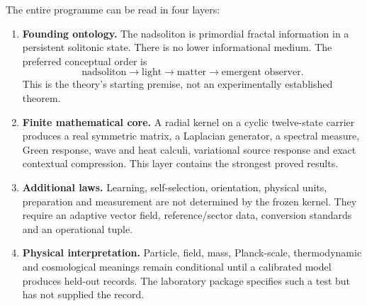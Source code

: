 \documentclass[11pt,a4paper]{article}
\theoremstyle{definition}
\theoremstyle{remark}
\begin{document}
The entire programme can be read in four layers:

\begin{enumerate}
\item \textbf{Founding ontology.} The nadsoliton is primordial fractal information in a persistent solitonic state. There is no lower informational medium. The preferred conceptual order is
\[
\text{nadsoliton}\longrightarrow\text{light}\longrightarrow\text{matter}\longrightarrow\text{emergent observer}.
\]
This is the theory's starting premise, not an experimentally established theorem.

\item \textbf{Finite mathematical core.} A radial kernel on a cyclic twelve-state carrier produces a real symmetric matrix, a Laplacian generator, a spectral measure, Green response, wave and heat calculi, variational source response and exact contextual compression. This layer contains the strongest proved results.

\item \textbf{Additional laws.} Learning, self-selection, orientation, physical units, preparation and measurement are not determined by the frozen kernel. They require an adaptive vector field, reference/sector data, conversion standards and an operational tuple.

\item \textbf{Physical interpretation.} Particle, field, mass, Planck-scale, thermodynamic and cosmological meanings remain conditional until a calibrated model produces held-out records. The laboratory package specifies such a test but has not supplied the record.
\end{enumerate}
\end{document}
